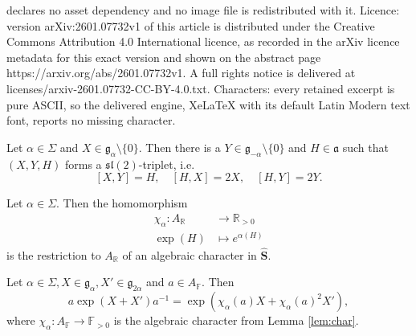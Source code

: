\documentclass[10pt,a4paper]{amsart}
\newcommand{\F}{\mathbb{F} }
\newcommand{\R}{\mathbb{R} }
\newcommand{\bS}{\mathbf{S}}
\newcommand{\fraka}{\mathfrak{a}}
\newcommand{\frakg}{\mathfrak{g}}
\begin{document}
declares no asset dependency and no image file is redistributed with it. Licence: version arXiv:2601.07732v1 of this article is distributed under the Creative Commons Attribution 4.0 International licence, as recorded in the arXiv licence metadata for this exact version and shown on the abstract page https://arxiv.org/abs/2601.07732v1. A full rights notice is delivered at licenses/arxiv-2601.07732-CC-BY-4.0.txt. Characters: every retained excerpt is pure ASCII, so the delivered engine, XeLaTeX with its default Latin Modern text font, reports no missing character.
\begin{lemma}\label{lem:JM_basic}
	Let $\alpha \in \Sigma$ and $X \in \frakg_\alpha \setminus \{0\}$. Then there is a $Y \in \frakg_{-\alpha} \setminus \{0\}$ and $H \in \fraka$ such that $(X,Y,H)$ forms a $\mathfrak{sl}(2)$-triplet, i.e.
	$$
	[X,Y] = H, \quad [H,X] = 2X,  \quad [H,Y]=2Y.
	$$
\end{lemma}

\begin{lemma}\label{lem:char}
	Let $\alpha \in \Sigma$. Then the homomorphism
	\begin{align*}
		\chi_\alpha \colon A_\R & \to \R_{>0} \\
		\exp(H) &\mapsto e^{\alpha(H)}
	\end{align*}
	is the restriction to $A_\R$ of an algebraic character in $\hat{\bS}$. 
\end{lemma}

\begin{lemma} \label{lem:aexpXa}
	Let $\alpha \in \Sigma, X\in \mathfrak{g}_\alpha, X' \in \mathfrak{g}_{2\alpha}$ and $a \in A_\F $. Then 
	$$a\exp\left(X + X'\right)a^{-1} = \exp\left(\chi_\alpha (a) X + \chi_\alpha(a)^2 X'\right),$$
	where $\chi_\alpha \colon A_\F \to \mathbb{F}_{>0}$ is the algebraic character from Lemma \ref{lem:char}.
\end{lemma}
\end{document}
